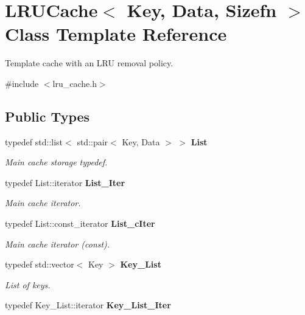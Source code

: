 \section{LRUCache$<$ Key, Data, Sizefn $>$ Class Template Reference}
\label{classLRUCache}


Template cache with an LRU removal policy.  




{\ttfamily \#include $<$lru\_\-cache.h$>$}

\subsection*{Public Types}
\begin{DoxyCompactItemize}
\item 
typedef std::list$<$ std::pair$<$ Key, Data $>$ $>$ {\bf List}\label{classLRUCache_ad0c8ac49227b80937fa8f6a2edd8d67f}

\begin{DoxyCompactList}\small\item\em Main cache storage typedef. \item\end{DoxyCompactList}\item 
typedef List::iterator {\bf List\_\-Iter}\label{classLRUCache_a3c656ba5944009b260049c8a67e42037}

\begin{DoxyCompactList}\small\item\em Main cache iterator. \item\end{DoxyCompactList}\item 
typedef List::const\_\-iterator {\bf List\_\-cIter}\label{classLRUCache_a7a9d5fc54bec471ff96c5aefab17acf9}

\begin{DoxyCompactList}\small\item\em Main cache iterator (const). \item\end{DoxyCompactList}\item 
typedef std::vector$<$ Key $>$ {\bf Key\_\-List}\label{classLRUCache_aaa32d864b92c5bb8df559b363a69cf21}

\begin{DoxyCompactList}\small\item\em List of keys. \item\end{DoxyCompactList}\item 
typedef Key\_\-List::iterator {\bf Key\_\-List\_\-Iter}\label{classLRUCache_a2504cf65d69d046d4010a4102e2c17c8}


\end{DoxyCompactItemize}
